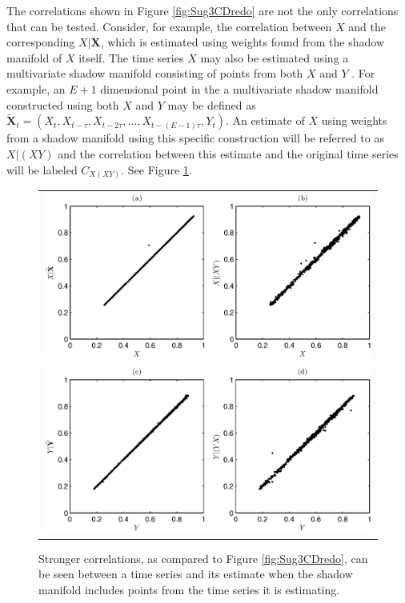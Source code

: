 \documentclass[twocolumn,aps,pre,groupedaddress]{revtex4-1}
\begin{document}
The correlations shown in Figure \ref{fig:Sug3CDredo} are not the only correlations that can be tested.  Consider, for example, the correlation between $X$ and the corresponding $X|\mathbf{X}$, which is estimated using weights found from the shadow manifold of $X$ itself.  The time series $X$ may also be estimated using a multivariate shadow manifold consisting of points from both $X$ and $Y$ \cite{Deyle2013}.  For example, an $E+1$ dimensional point in the a multivariate shadow manifold constructed using both $X$ and $Y$ may be defined as $\tilde{\mathbf{X}}_t=(X_t,X_{t-\tau},X_{t-2\tau},\ldots,X_{t-(E-1)\tau},Y_t)$.  An estimate of $X$ using weights from a shadow manifold using this specific construction will be referred to as $X|(XY)$ and the correlation between this estimate and the original time series will be labeled $C_{X(XY)}$.  See Figure \ref{fig:PAIintro}.
\begin{figure}[ht]
\begin{tabular}{c}
\includegraphics[scale=0.5]{SugFig3CD_AddPlotAB.eps} \\
\includegraphics[scale=0.5]{SugFig3CD_AddPlotCD.eps}
\end{tabular}
\caption{Stronger correlations, as compared to Figure \ref{fig:Sug3CDredo}, can be seen between a time series and its estimate when the shadow manifold includes points from the time series it is estimating.}
\label{fig:PAIintro}
\end{figure}
\end{document}
